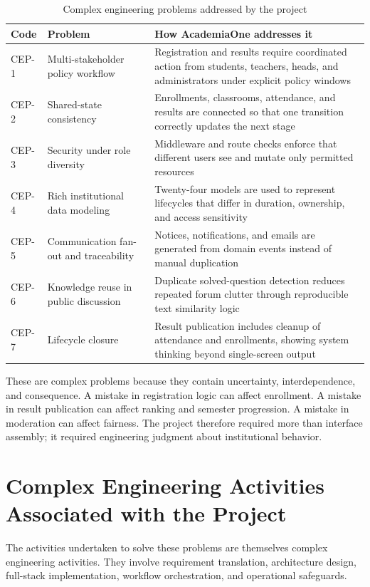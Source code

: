 \documentclass[12pt,a4paper]{report}
\newcommand{\systemName}{AcademiaOne}
\begin{document}
\begin{table}[H]
  \centering
  \caption{Complex engineering problems addressed by the project}
  \label{tab:complex-problems}
  \renewcommand{\arraystretch}{1.2}
  \begin{tabularx}{\textwidth}{p{1.1in}p{2.0in}Y}
    \toprule
    \textbf{Code} & \textbf{Problem} & \textbf{How \systemName{} addresses it} \\
    \midrule
    CEP-1 & Multi-stakeholder policy workflow & Registration and results require coordinated action from students, teachers, heads, and administrators under explicit policy windows \\
    CEP-2 & Shared-state consistency & Enrollments, classrooms, attendance, and results are connected so that one transition correctly updates the next stage \\
    CEP-3 & Security under role diversity & Middleware and route checks enforce that different users see and mutate only permitted resources \\
    CEP-4 & Rich institutional data modeling & Twenty-four models are used to represent lifecycles that differ in duration, ownership, and access sensitivity \\
    CEP-5 & Communication fan-out and traceability & Notices, notifications, and emails are generated from domain events instead of manual duplication \\
    CEP-6 & Knowledge reuse in public discussion & Duplicate solved-question detection reduces repeated forum clutter through reproducible text similarity logic \\
    CEP-7 & Lifecycle closure & Result publication includes cleanup of attendance and enrollments, showing system thinking beyond single-screen output \\
    \bottomrule
  \end{tabularx}
\end{table}

These are complex problems because they contain uncertainty, interdependence, and consequence. A mistake in registration logic can affect enrollment. A mistake in result publication can affect ranking and semester progression. A mistake in moderation can affect fairness. The project therefore required more than interface assembly; it required engineering judgment about institutional behavior.

\section{Complex Engineering Activities Associated with the Project}
The activities undertaken to solve these problems are themselves complex engineering activities. They involve requirement translation, architecture design, full-stack implementation, workflow orchestration, and operational safeguards.
\end{document}
